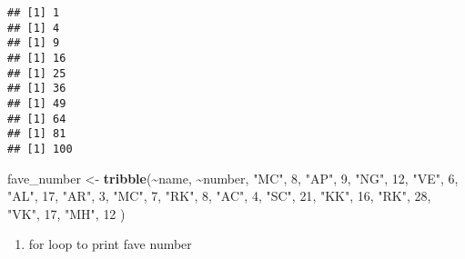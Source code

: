 \documentclass[
]{article}
\newenvironment{Shaded}{\begin{snugshade}}{\end{snugshade}}
\newcommand{\ControlFlowTok}[1]{\textcolor[rgb]{0.13,0.29,0.53}{\textbf{#1}}}
\newcommand{\DecValTok}[1]{\textcolor[rgb]{0.00,0.00,0.81}{#1}}
\newcommand{\FunctionTok}[1]{\textcolor[rgb]{0.13,0.29,0.53}{\textbf{#1}}}
\newcommand{\NormalTok}[1]{#1}
\newcommand{\OtherTok}[1]{\textcolor[rgb]{0.56,0.35,0.01}{#1}}
\newcommand{\SpecialCharTok}[1]{\textcolor[rgb]{0.81,0.36,0.00}{\textbf{#1}}}
\newcommand{\StringTok}[1]{\textcolor[rgb]{0.31,0.60,0.02}{#1}}
\providecommand{\tightlist}{%
  \setlength{\itemsep}{0pt}\setlength{\parskip}{0pt}}
\begin{document}
\begin{verbatim}
## [1] 1
## [1] 4
## [1] 9
## [1] 16
## [1] 25
## [1] 36
## [1] 49
## [1] 64
## [1] 81
## [1] 100
\end{verbatim}

\begin{Shaded}
\begin{Highlighting}[]
\NormalTok{fave\_number }\OtherTok{\textless{}{-}} \FunctionTok{tribble}\NormalTok{(}\SpecialCharTok{\textasciitilde{}}\NormalTok{name, }\SpecialCharTok{\textasciitilde{}}\NormalTok{number,}
                       \StringTok{"MC"}\NormalTok{, }\DecValTok{8}\NormalTok{,}
                       \StringTok{"AP"}\NormalTok{, }\DecValTok{9}\NormalTok{,}
                       \StringTok{"NG"}\NormalTok{, }\DecValTok{12}\NormalTok{,}
                       \StringTok{"VE"}\NormalTok{, }\DecValTok{6}\NormalTok{,}
                       \StringTok{"AL"}\NormalTok{, }\DecValTok{17}\NormalTok{,}
                       \StringTok{"AR"}\NormalTok{, }\DecValTok{3}\NormalTok{,}
                       \StringTok{"MC"}\NormalTok{, }\DecValTok{7}\NormalTok{,}
                       \StringTok{"RK"}\NormalTok{, }\DecValTok{8}\NormalTok{,}
                       \StringTok{"AC"}\NormalTok{, }\DecValTok{4}\NormalTok{,}
                       \StringTok{"SC"}\NormalTok{, }\DecValTok{21}\NormalTok{,}
                       \StringTok{"KK"}\NormalTok{, }\DecValTok{16}\NormalTok{,}
                       \StringTok{"RK"}\NormalTok{, }\DecValTok{28}\NormalTok{,}
                       \StringTok{"VK"}\NormalTok{, }\DecValTok{17}\NormalTok{,}
                       \StringTok{"MH"}\NormalTok{, }\DecValTok{12}
\NormalTok{                        )}
\end{Highlighting}
\end{Shaded}

\begin{enumerate}
\def\labelenumi{\arabic{enumi}.}
\tightlist
\item
  for loop to print fave number
\end{enumerate}

\begin{Shaded}
\end{Shaded}
\end{document}
